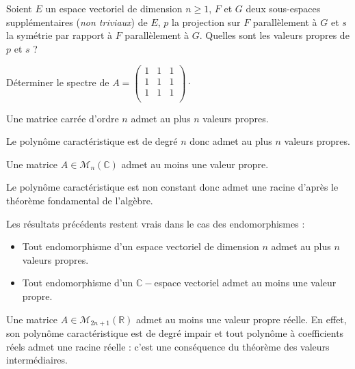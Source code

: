 \documentclass[a4paper,10pt]{report}
\begin{document}
\begin{ex} Soient $E$ un espace vectoriel de dimension $n \geq 1$, $F$ et $G$ deux sous-espaces supplémentaires (\textit{non triviaux}) de $E$, $p$ la projection sur $F$ parallèlement à $G$ et $s$ la symétrie par rapport à $F$ parallèlement à $G$. Quelles sont les valeurs propres de $p$ et $s$ ?

\vspace{4cm}
\end{ex} 

\begin{exa} Déterminer le spectre de $A = \begin{pmatrix}
1 & 1 & 1 \\
1 & 1 & 1 \\
1 & 1 & 1 \\
\end{pmatrix}\cdot$
\end{exa}

\begin{cor} Une matrice carrée d'ordre $n$ admet au plus $n$ valeurs propres.
\end{cor}

\begin{preuve} Le polynôme caractéristique est de degré $n$ donc admet au plus $n$ valeurs propres.
\end{preuve}

\begin{cor} Une matrice $A \in \mathcal{M}_n(\mathbb{C})$ admet au moins une valeur propre.
\end{cor}

\begin{preuve} Le polynôme caractéristique est non constant donc admet une racine d'après le théorème fondamental de l'algèbre.
\end{preuve}

\medskip

\begin{rems}
\item Les résultats précédents restent vrais dans le cas des endomorphismes : 
\begin{itemize}
\item Tout endomorphisme d'un espace vectoriel de dimension $n$ admet au plus $n$ valeurs propres.
\item Tout endomorphisme d'un $\mathbb{C}-$espace vectoriel admet au moins une valeur propre.
\end{itemize}
\item Une matrice $A \in \mathcal{M}_{2n+1}(\mathbb{R})$ admet au moins une valeur propre réelle. En effet, son polynôme caractéristique est de degré impair et tout polynôme à coefficients réels admet une racine réelle : c'est une conséquence du théorème des valeurs intermédiaires.
\end{rems}
\end{document}
